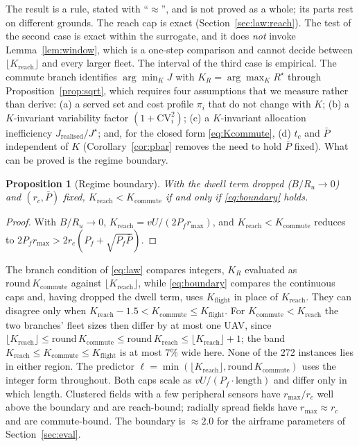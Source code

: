 \documentclass[journal,outdir=./]{IEEEtran}
\newtheorem{proposition}{Proposition}
\newcommand{\Kr}{K_{\mathrm{reach}}}
\newcommand{\Kc}{K_{\mathrm{commute}}}
\newcommand{\rmax}{r_{\max}}
\newcommand{\rc}{r_{c}}
\newcommand{\Pbar}{\bar{P}}
\newcommand{\Pf}{P_{f}}
\newcommand{\Ru}{R_u}
\begin{document}
The result is a rule, stated with ``$\approx$'', and is not proved as a whole; its parts rest on different grounds. The reach cap is exact (Section~\ref{sec:law:reach}). The test of the second case is exact within the surrogate, and it does \emph{not} invoke Lemma~\ref{lem:window}, which is a one-step comparison and cannot decide between $\lfloor\Kr\rfloor$ and every larger fleet. The interval of the third case is empirical. The commute branch identifies $\arg\min_KJ$ with $K_R=\arg\max_KR^{\star}$ through Proposition~\ref{prop:sqrt}, which requires four assumptions that we measure rather than derive: (a) a served set and cost profile $\pi_i$ that do not change with $K$; (b) a $K$-invariant variability factor $(1+\mathrm{CV}_i^2)$; (c) a $K$-invariant allocation inefficiency $J_{\mathrm{realised}}/J^{\star}$; and, for the closed form \eqref{eq:Kcommute}, (d) $t_c$ and $\Pbar$ independent of $K$ (Corollary~\ref{cor:pbar} removes the need to hold $\Pbar$ fixed). What can be proved is the regime boundary.
\begin{proposition}[Regime boundary]\label{prop:boundary}
With the dwell term dropped ($B/\Ru\to0$) and $(\rc,\Pbar)$ fixed, $\Kr<\Kc$ if and only if \eqref{eq:boundary} holds.
\end{proposition}
\begin{proof}
With $B/\Ru\to0$, $\Kr=vU/(2\Pf\rmax)$, and $\Kr<\Kc$ reduces to $2\Pf\rmax>2\rc(\Pf+\sqrt{\Pf\Pbar})$.
\end{proof}
The branch condition of \eqref{eq:law} compares integers, $K_R$ evaluated as $\mathrm{round}\,\Kc$ against $\lfloor\Kr\rfloor$, while \eqref{eq:boundary} compares the continuous caps and, having dropped the dwell term, uses $K_{\mathrm{flight}}$ in place of $\Kr$. They can disagree only when $\Kr-1.5<\Kc\le K_{\mathrm{flight}}$. For $\Kc<\Kr$ the two branches' fleet sizes then differ by at most one UAV, since $\lfloor\Kr\rfloor\le\mathrm{round}\,\Kc\le\mathrm{round}\,\Kr\le\lfloor\Kr\rfloor+1$; the band $\Kr\le\Kc\le K_{\mathrm{flight}}$ is at most $7\%$ wide here. None of the 272 instances lies in either region. The predictor $\ell=\min(\lfloor\Kr\rfloor,\mathrm{round}\,\Kc)$ uses the integer form throughout.
Both caps scale as $vU/(\Pf\cdot\text{length})$ and differ only in which length. Clustered fields with a few peripheral sensors have $\rmax/\rc$ well above the boundary and are reach-bound; radially spread fields have $\rmax\approx\rc$ and are commute-bound. The boundary is $\approx2.0$ for the airframe parameters of Section~\ref{sec:eval}.
\end{document}
